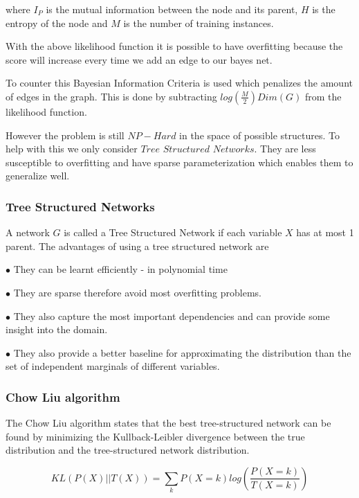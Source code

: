 where $I_P$ is the mutual information between the node and its parent, $H$ is the entropy of the node and $M$ is the number of training instances.


With the above likelihood function it is possible to have overfitting because the score will increase every time we add an edge to our bayes net.

To counter this Bayesian Information Criteria is used which penalizes the amount of edges in the graph. This is done by subtracting $log(\frac{M}{2})Dim(G)$ from the likelihood function.

However the problem is still $NP-Hard$ in the space of possible structures. To help with this we only consider $Tree$ $Structured$ $Networks$. They are less susceptible to overfitting and have sparse parameterization which enables them to generalize well.

\subsubsection{Tree Structured Networks}

A network $G$ is called a Tree Structured Network if each variable $X$ has at most 1 parent.
The advantages of using a tree structured network are

$\bullet$ They can be learnt efficiently - in polynomial time

$\bullet$ They are sparse therefore avoid most overfitting problems.

$\bullet$ They also capture the most important dependencies and can provide some insight into the domain.

$\bullet$ They also provide a better baseline for approximating the distribution than the set of independent marginals of different variables.

\subsubsection{Chow Liu algorithm} 
\label{sec:chowliu}

The Chow Liu algorithm \cite{chowliu} states that the best tree-structured network can be found by minimizing the Kullback-Leibler divergence between the true distribution and the tree-structured network distribution.

\begin{equation}
KL(P(X) || T(X)) = \sum _kP(X=k) log(\frac{P(X=k)}{T(X=k)})
\end{equation}


